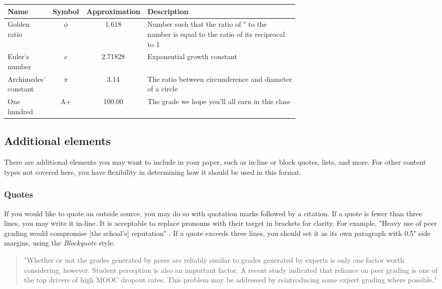 \documentclass[
	letterpaper, %
]{jdf}
\begin{document}
\begin{Abstract}
\begin{jdftable}
\label{table:Example}
\small %
\begin{tabular}{@{} L{0.15\linewidth} c S L{0.52\linewidth}}
	\textbf{Name} & \textbf{Symbol} & \textbf{Approximation} & \textbf{Description} \\
	\toprule[0.5pt]
	Golden ratio & $\phi$ & 1.618 & Number such that the ratio of " to the number is equal to the ratio of its reciprocal to 1\\
	\midrule
	Euler's number & $e$ & 2.71828 & Exponential growth constant\\
	\midrule
	Archimedes' constant & $\pi$ & 3.14 & The ratio between circumference and diameter of a circle\\
	\midrule
	One hundred & A+ & 100.00 & The grade we hope you’ll all earn in this class\\
\end{tabular}
\end{jdftable}

\subsection{Additional elements}
There are additional elements you may want to include in your paper, such as in-line or block quotes, lists, and more. For other content types not covered here, you have flexibility in determining how it should be used in this format.

\subsubsection{Quotes}
If you would like to quote an outside source, you may do so with quotation marks followed by a citation. If a quote is fewer than three lines, you may write it in-line. It is acceptable to replace pronouns with their target in brackets for clarity. For example, "Heavy use of peer grading would compromise [the school’s] reputation" \citep{joyner2016}. If a quote exceeds three lines, you should set it as its own paragraph with 0.5" side margins, using the \emph{Blockquote} style.

\begin{quotation}
"Whether or not the grades generated by peers are reliably similar to grades generated by experts is only one factor worth considering, however. Student perception is also an important factor. A recent study indicated that reliance on peer grading is one of the top drivers of high MOOC dropout rates. This problem may be addressed by reintroducing some expert grading where possible." \citep{joyner2016}
\end{quotation}


\end{Abstract}
\end{document}
